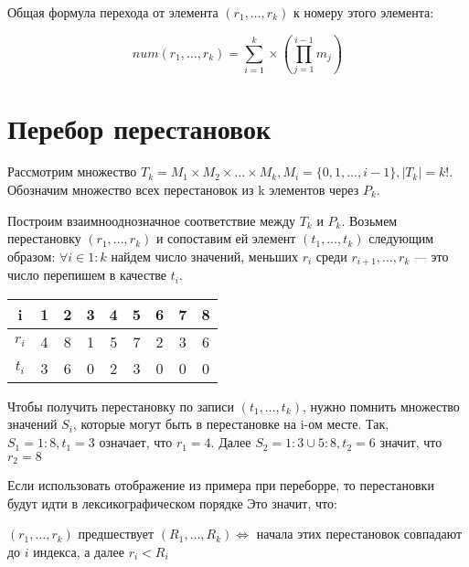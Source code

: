 Общая формула перехода от элемента $(r_1, \ldots, r_k)$ к номеру этого элемента:

$$num(r_1, \ldots, r_k) = \sum_{i=1}^{k} \times (\prod_{j=1}^{i-1}m_j)$$


\section{Перебор перестановок}

Рассмотрим множество $T_k = M_1 \times M_2 \times \ldots \times M_k, M_i = \{0, 1, \ldots, i - 1\}, |T_k| = k!$. Обозначим множество всех перестановок из k элементов через $P_k$.

Построим взаимнооднозначное соответствие между $T_k$ и $P_k$. Возьмем перестановку $(r_1, \ldots, r_k)$ и сопоставим ей элемент $(t_1, \ldots, t_k)$ следующим образом: $\forall i \in 1:k$ найдем число значений, меньших $r_i$ среди $r_{i+1}, \ldots, r_k$ --- это число перепишем в качестве $t_i$.


\begin{eg}
    \begin{tabular}{|c|c|c|c|c|c|c|c|c|}
        \hline
        i & 1 & 2 & 3 & 4 & 5 & 6 & 7 & 8 \\
        \hline
        $r_i$ & 4 & 8 & 1 & 5 & 7 & 2 & 3 & 6 \\
        \hline
        $t_i$ & 3 & 6 & 0 & 2 & 3 & 0 & 0 & 0 \\
        \hline
    \end{tabular}

    Чтобы получить перестановку по записи $(t_1, \ldots, t_k)$, нужно помнить множество значений $S_i$, которые могут быть в перестановке на i-ом месте. Так, $S_1 = 1:8, t_1 = 3$ означает, что $r_1 = 4$. Далее $S_2 = 1:3 \cup 5:8, t_2 = 6$ значит, что $r_2 = 8$
\end{eg}

\begin{remark}
    Если использовать отображение из примера при переборре, то перестановки будут идти в лексикографическом порядке Это значит, что:

    $(r_1, \ldots, r_k)$ предшествует $(R_1, \ldots, R_k) \Leftrightarrow$ начала этих перестановок совпадают до $i$ индекса, а далее $r_i < R_i$ 
\end{remark}

